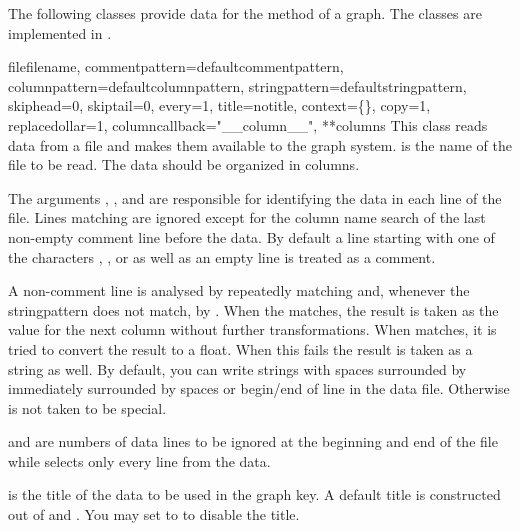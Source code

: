 
The following classes provide data for the  method of a
graph. The classes are implemented in .

\begin{classdesc}{file}{filename, %
                        commentpattern=defaultcommentpattern,
                        columnpattern=defaultcolumnpattern,
                        stringpattern=defaultstringpattern,
                        skiphead=0, skiptail=0, every=1, title=notitle,
                        context=\{\}, copy=1,
                        replacedollar=1, columncallback="\_\_column\_\_",
                        **columns}
  This class reads data from a file and makes them available to the
  graph system.  is the name of the file to be read.
  The data should be organized in columns.

  The arguments , , and
   are responsible for identifying the data in each
  line of the file. Lines matching  are ignored
  except for the column name search of the last non-empty comment line
  before the data. By default a line starting with one of the
  characters \character{\#}, \character{\%}, or \character{!} as well
  as an empty line is treated as a comment.

  A non-comment line is analysed by repeatedly matching
   and, whenever the stringpattern does not match,
  by . When the  matches, the
  result is taken as the value for the next column without further
  transformations. When  matches, it is tried to
  convert the result to a float. When this fails the result is taken
  as a string as well. By default, you can write strings with spaces
  surrounded by \character{\textquotedbl} immediately surrounded by
  spaces or begin/end of line in the data file. Otherwise
  \character{\textquotedbl} is not taken to be special.

   and  are numbers of data lines to be
  ignored at the beginning and end of the file while 
  selects only every  line from the data.

   is the title of the data to be used in the graph key. A
  default title is constructed out of  and
  . You may set  to  to disable
  the title.


\end{classdesc}
